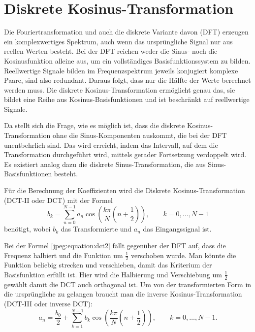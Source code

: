 %
%
%
%
\section{Diskrete Kosinus-Transformation
\label{jpeg:section:dct}}
Die Fouriertransformation und auch die diskrete Variante davon (DFT) erzeugen ein komplexwertiges Spektrum, auch wenn das ursprüngliche Signal nur aus reellen Werten besteht.
Bei der DFT reichen weder die Sinus- noch die Kosinusfunktion alleine aus, um ein vollständiges Basisfunktions\-system zu bilden.
Reellwertige Signale bilden im Frequenzspektrum jeweils konjugiert komplexe Paare, sind also redundant.
Daraus folgt, dass nur die Hälfte der Werte berechnet werden muss.
Die diskrete Kosinus-Transformation ermöglicht genau das, sie bildet eine Reihe aus Kosinus-Basisfunktionen und ist beschränkt auf reellwertige Signale.

Da stellt sich die Frage, wie es möglich ist, dass die diskrete Kosinus-Transformation ohne die Sinus-Komponenten auskommt, die bei der DFT unentbehrlich sind.
Das wird erreicht, indem das Intervall, auf dem die Transformation durchgeführt wird, mittels gerader Fortsetzung verdoppelt wird.
Es existiert analog dazu die diskrete Sinus-Transformation, die aus Sinus-Basisfunktionen besteht.

Für die Berechnung der Koeffizienten wird die Diskrete Kosinus-Transformation (DCT-II oder DCT) mit der Formel
\begin{equation}
    b_k
    =
    \sum \limits_{n=0}^{N-1} a_n 
    \cos\left(
        \frac{k\pi}{N}\left(n + \frac{1}{2} \right) 
    \right),
    \qquad k = 0,\dots,N-1
\label{jpeg:equation:dct2}
\end{equation}
benötigt, wobei \(b_k\) das Transformierte und \(a_n\) das Eingangssignal ist.

Bei der Formel \eqref{jpeg:equation:dct2} fällt gegenüber der DFT auf, dass die Frequenz halbiert und die Funktion um \(\frac{1}{2}\) verschoben wurde.
Man könnte die Funktion beliebig strecken und verschieben, damit das Kriterium der Basisfunktion erfüllt ist.
Hier wird die Halbierung und Verschiebung um \(\frac{1}{2}\) gewählt damit die DCT auch orthogonal ist.
Um von der transformierten Form in die ursprüngliche zu gelangen braucht man die inverse Kosinus-Transformation (DCT-III oder inverse DCT):
\begin{equation}
    a_n
    =
    \frac{b_0}{2} +
    \sum \limits_{k=1}^{N-1} b_k 
    \cos\left(
    \frac{k\pi}{N}\left(n + \frac{1}{2} \right) 
    \right),
    \qquad k = 0,\dots,N-1.
    \label{jpeg:equation:dct3}
\end{equation}

